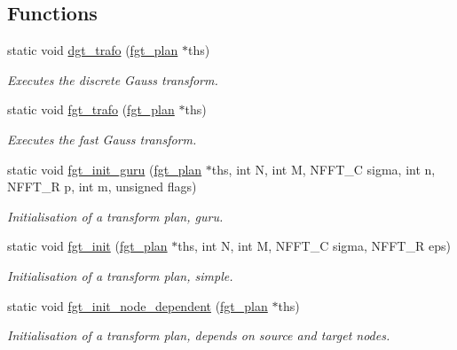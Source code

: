 \subsection*{Functions}
\begin{DoxyCompactItemize}
\item 
static void \hyperlink{group__applications__fastgauss_ga0dc2e6b972e6c917cd891f5fbd06159f}{dgt\-\_\-trafo} (\hyperlink{structfgt__plan}{fgt\-\_\-plan} $\ast$ths)
\begin{DoxyCompactList}\small\item\em Executes the discrete Gauss transform. \end{DoxyCompactList}\item 
static void \hyperlink{group__applications__fastgauss_ga16cdded834762cd155f6277685d60258}{fgt\-\_\-trafo} (\hyperlink{structfgt__plan}{fgt\-\_\-plan} $\ast$ths)
\begin{DoxyCompactList}\small\item\em Executes the fast Gauss transform. \end{DoxyCompactList}\item 
static void \hyperlink{group__applications__fastgauss_ga8531c383d723a20e3c8a99a400e0019a}{fgt\-\_\-init\-\_\-guru} (\hyperlink{structfgt__plan}{fgt\-\_\-plan} $\ast$ths, int N, int M, N\-F\-F\-T\-\_\-\-C sigma, int n, N\-F\-F\-T\-\_\-\-R p, int m, unsigned flags)
\begin{DoxyCompactList}\small\item\em Initialisation of a transform plan, guru. \end{DoxyCompactList}\item 
static void \hyperlink{group__applications__fastgauss_gafe5ae1b90fe2f98495f5c7df70fdcdc8}{fgt\-\_\-init} (\hyperlink{structfgt__plan}{fgt\-\_\-plan} $\ast$ths, int N, int M, N\-F\-F\-T\-\_\-\-C sigma, N\-F\-F\-T\-\_\-\-R eps)
\begin{DoxyCompactList}\small\item\em Initialisation of a transform plan, simple. \end{DoxyCompactList}\item 
static void \hyperlink{group__applications__fastgauss_gadabf8e2765e840b32543b5a0f4d8aa62}{fgt\-\_\-init\-\_\-node\-\_\-dependent} (\hyperlink{structfgt__plan}{fgt\-\_\-plan} $\ast$ths)
\begin{DoxyCompactList}\small\item\em Initialisation of a transform plan, depends on source and target nodes. \end{DoxyCompactList}\item 

\end{DoxyCompactItemize}
